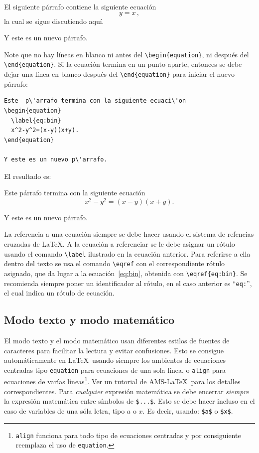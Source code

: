 \documentclass{article}
\begin{document}
El siguiente párrafo contiene la siguiente ecuación
\begin{equation}
  \label{eq:1}
  y=x\,,
\end{equation}
la cual se sigue discutiendo aquí.

Y este es un nuevo párrafo.

\bigskip

Note que no hay líneas en blanco ni antes del \verb|\begin{equation}|, ni después del \verb|\end{equation}|. Si la ecuación termina en un punto aparte, entonces se debe dejar una línea en blanco después del \verb|\end{equation}| para iniciar el nuevo párrafo:

\begin{lstlisting}
Este  p\'arrafo termina con la siguiente ecuaci\'on
\begin{equation}
  \label{eq:bin}
  x^2-y^2=(x-y)(x+y).
\end{equation}

Y este es un nuevo p\'arrafo.
\end{lstlisting}
El resultado es:

Este  párrafo termina con la siguiente ecuación
\begin{equation}
  \label{eq:bin}
  x^2-y^2=(x-y)(x+y).
\end{equation}

Y este es un nuevo párrafo. 

La referencia a una ecuación siempre se debe hacer usando el sistema de refencias cruzadas de \LaTeX{}. A la ecuación a referenciar se le debe asignar un rótulo usando el comando \verb|\label| ilustrado en la ecuación anterior. Para referirse a ella dentro del texto se usa el comando \verb|\eqref| con el correspondiente rótulo asignado, que da lugar a la ecuación~\eqref{eq:bin}, obtenida con \verb|\eqref{eq:bin}|. Se recomienda siempre poner un identificador al rótulo, en el caso anterior es ``\verb|eq:|'', el cual indica un rótulo de ecuación.

\subsection{Modo texto y modo matemático}

El modo texto y el modo matemático usan diferentes estilos de fuentes de caracteres para facilitar la lectura y evitar confusiones. Esto se consigue automáticamente en \LaTeX\ usando siempre los ambientes de ecuaciones centradas tipo \verb|equation| para ecuaciones de una sola línea, o \verb|align| para ecuaciones de varías 
líneas\footnote{\texttt{align} funciona para todo tipo de ecuaciones centradas y por consiguiente reemplaza el uso de \texttt{equation}. }.
Ver un tutorial de AMS-\LaTeX\ para los detalles correspondientes. Para \emph{cualquier} expresión matemática se debe encerrar  \emph{siempre} la expresión matemática entre símbolos de \verb|$...$|.
Esto se debe hacer incluso en el caso de variables de una sóla letra, tipo $a$ o $x$. Es decir, usando: \verb|$a$| o \verb|$x$|.
\end{document}
